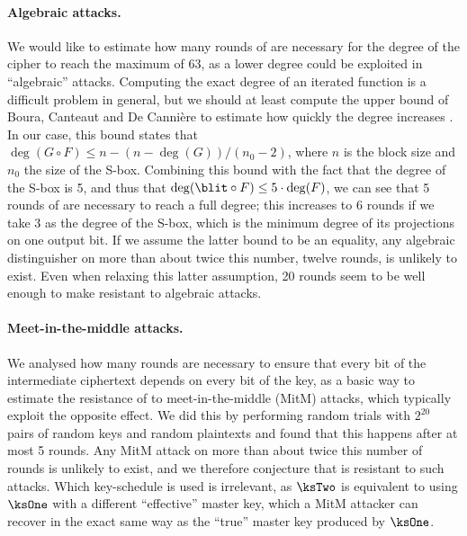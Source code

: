 \paragraph{Algebraic attacks.}
We would like to estimate how many rounds of \fly are necessary for the degree of the cipher to reach the maximum of 63, as a lower degree could be exploited in
``algebraic'' attacks. Computing the exact degree of an iterated function is a difficult problem in general, but we should at least compute the upper bound of Boura, Canteaut and De Cannière
to estimate how quickly the degree increases \cite{permdegree}. In our case, this bound states that $\deg(G \circ F) \leq n - (n - \deg(G))/(n_0 - 2)$, where $n$ is the block size and $n_0$ the
size of the S-box. Combining this bound with the fact that the degree of the S-box is 5, and thus that $\deg(\blit \circ F) \leq 5\cdot\deg(F)$, we can see that 5 rounds of
\fly are necessary to reach a full degree; this increases to 6 rounds if we take 3 as the degree of the S-box, which is the minimum degree of its projections on one
output bit. If we assume the latter bound to be an equality, any algebraic distinguisher on more than about twice this number, \ie twelve rounds, is unlikely to exist. 
Even when relaxing this latter assumption, 20 rounds seem to be well enough to make \fly resistant to algebraic attacks.

\paragraph{Meet-in-the-middle attacks.}
We analysed how many rounds are necessary to ensure that every bit of the intermediate ciphertext depends on every bit of the key, as a basic way to estimate the resistance
of \fly to meet-in-the-middle (MitM) attacks, which typically exploit the opposite effect. We did this by performing random trials with $2^{20}$ pairs of random
keys and random plaintexts and found that this happens after at most 5 rounds. Any MitM attack on more than about twice this number of rounds is unlikely to exist, and
we therefore conjecture that \fly is resistant to such attacks. Which key-schedule is used is irrelevant, as $\ksTwo$ is equivalent to
using $\ksOne$ with a different ``effective'' master key, which a MitM attacker can recover in the exact same way as the ``true'' master key produced by $\ksOne$.

